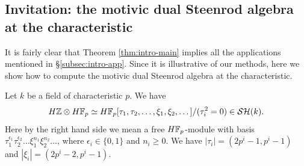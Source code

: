 \documentclass{amsart}
\numberwithin{proposition}{section}
\numberwithin{equation}{section}
\begin{document}
\subsection{Invitation: the motivic dual Steenrod algebra at the characteristic}
It is fairly clear that Theorem \ref{thm:intro-main} implies all the applications mentioned in \S\ref{subsec:intro-app}.
Since it is illustrative of our methods, here we show how to compute the motivic dual Steenrod algebra at the characteristic.
\begin{corollary} \label{cor:intro-steenrod}
Let $k$ be a field of characteristic $p$.
We have \[ H\mathbb{Z} \otimes H\mathbb{F}_p \simeq H\mathbb{F}_p[\tau_1,\tau_2, \dots, \xi_1, \xi_2, \dots]/(\tau_i^2 = 0) \in \mathcal{SH}(k). \]
Here by the right hand side we mean a free $H\mathbb{F}_p$-module with basis $\tau_1^{\epsilon_1} \tau_2^{\epsilon_2} \dots \xi_1^{n_1} \xi_2^{n_2} \dots$, where $\epsilon_i \in \{0,1\}$ and $n_i \ge 0$.
We have $|\tau_i| = (2p^i-1,p^i-1)$ and $|\xi_i| = (2p^i-2,p^i-1)$.
\end{corollary}
\end{document}
